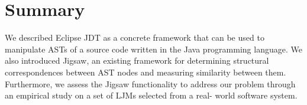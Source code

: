 \section{Summary}  \label{summary}
We described Eclipse JDT as a concrete framework that can be used  to manipulate ASTs of a source code written in the Java programming language. We also introduced Jigsaw, an existing framework for determining structural correspondences between AST nodes and measuring similarity between them. Furthermore, we assess the Jigsaw functionality to address our problem through an empirical study on a set of LJMs selected from a real- world software system.

